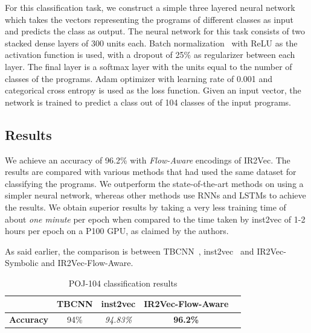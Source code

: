 For this classification task, we construct a simple three layered neural network which takes the vectors representing the programs of different classes as input and predicts the class as output. The neural network for this task consists of two stacked dense layers of 300 units each. Batch normalization~\cite{pmlr-v37-ioffe15-batchnorm} with ReLU as the activation function is used, with a dropout of 25\% as regularizer between each layer. The final layer is a softmax layer with the units equal to the number of classes of the programs. Adam optimizer with learning rate of 0.001 and categorical cross entropy is used as the loss function. Given an input vector, the network is trained to predict a class out of 104 classes of the input programs. 

\subsection{Results}

We achieve an accuracy of 96.2\% with \textit{Flow-Aware} encodings of IR2Vec. 
The results are compared with various methods that had used the same dataset for classifying the programs. We outperform the state-of-the-art methods on using a simpler neural network, whereas other methods use RNNs and LSTMs to achieve the results.
We obtain superior results by taking a very less training time of about \textit{one minute} per epoch when compared to the time taken by inst2vec of 1-2 hours per epoch on a P100 GPU, as claimed by the authors. 

As said earlier, the comparison is between TBCNN~\cite{tbcnn-aaai16}, inst2vec~\cite{ncc} and IR2Vec-Symbolic and IR2Vec-Flow-Aware.

\begin{table}[h]
\centering
  \caption{POJ-104 classification results}
  \label{tab:pc_accuracy}   %
    \begin{tabular}{ccccc}
    \toprule
     & \textbf{TBCNN} & \textbf{inst2vec} & \textbf{IR2Vec-Flow-Aware}\\
        \hline
        \textbf{Accuracy} & 94\% & \textit{94.83\%\protect\footnotemark}  & \textbf{96.2\%} \\
    \bottomrule
    \end{tabular}
\end{table}


